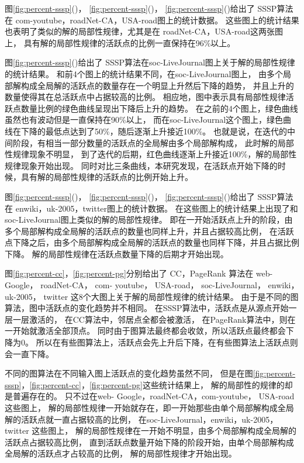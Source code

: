图\ref{fig:percent-sssp}()，
\ref{fig:percent-sssp}()，
\ref{fig:percent-sssp}()给出了
SSSP算法在 com-youtube，roadNet-CA，USA-road图上的统计数据。
这些图上的统计结果也表明了类似的解的局部性规律，尤其是在
roadNet-CA，USA-road这两张图上，
具有解的局部性规律的活跃点的比例一直保持在96\%以上。

图\ref{fig:percent-sssp}()给出了
SSSP算法在soc-LiveJournal图上关于解的局部性规律的统计结果。
和前4个图上的统计结果不同，在soc-LiveJournal图上，
由多个局部解构成全局解的活跃点的数量存在一个明显上升然后下降的趋势，
并且上升的数量使得其在总活跃点中占据较高的比例。
相应地，图中表示具有局部性规律活跃点数量比例的绿色曲线呈现出下降后上升的趋势。
在之前的4个图上，绿色曲线虽然也有波动但是一直保持在90\%以上，
而在soc-LiveJournal这个图上，绿色曲线在下降的最低点达到了50\%，随后逐渐上升接近100\%。
也就是说，在迭代的中间阶段，有相当一部分数量的活跃点的全局解由多个局部解构成，
此时解的局部性规律现象不明显，
到了迭代的后期，红色曲线逐渐上升接近100\%，解的局部性规律现象开始出现。
同时对比三条曲线，本研究发现，在活跃点开始下降的时候，具有解的局部性规律的活跃点的比例开始上升。

图\ref{fig:percent-sssp}()，
\ref{fig:percent-sssp}()，
\ref{fig:percent-sssp}()给出了
SSSP算法在 enwiki，uk-2005，twitter图上的统计数据。
在这些图上的统计结果上出现了和soc-LiveJournal图上类似的解的局部性规律。
即在一开始活跃点上升的阶段，由多个局部解构成全局解的活跃点的数量也同样上升，并且占据较高比例，
在活跃点下降之后，由多个局部解构成全局解的活跃点的数量也同样下降，并且占据比例下降。
解的局部性规律在活跃点数量下降的后期才开始出现。



图\ref{fig:percent-cc}，\ref{fig:percent-pg}分别给出了 
CC，PageRank 算法在 web-Google， roadNet-CA， com- youtube， USA-road， 
soc-LiveJournal， enwiki， uk-2005， twitter 
这8个大图上关于解的局部性规律的统计结果。
由于是不同的图算法，图中活跃点的变化趋势并不相同。
在SSSP算法中，活跃点是从源点开始一层一层激活的，
在CC算法中，邻居点全都会被激活，
在PageRank算法中，则在一开始就激活全部顶点。
同时由于图算法最终都会收敛，所以活跃点最终都会下降为0。
所以在有些图算法上，活跃点会先上升后下降，在有些图算法上活跃点则会一直下降。

不同的图算法在不同输入图上活跃点的变化趋势虽然不同，
但是在图\ref{fig:percent-sssp}，\ref{fig:percent-cc}，\ref{fig:percent-pg}这些统计结果上，
解的局部性的规律的却是普遍存在的。
只不过在web- Google，roadNet-CA，com-youtube， USA-road 这些图上，
解的局部性规律一开始就存在，即一开始那些由单个局部解构成全局解的活跃点就一直占据较高的比例，
在soc-LiveJournal，enwiki，uk-2005，twitter 这些图上，
解的局部性规律在一开始不明显，由多个局部解构成全局解的活跃点占据较高比例，
直到活跃点数量开始下降的阶段开始，由单个局部解构成全局解的活跃点才占较高的比例，
解的局部性规律才开始出现。


